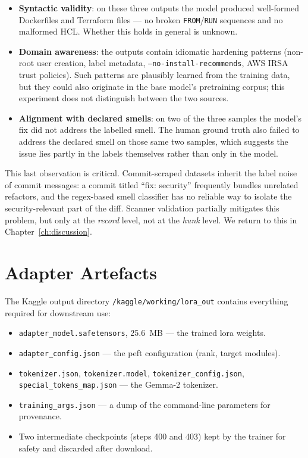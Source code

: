 \documentclass[12pt, a4paper]{report}
\begin{document}
\begin{itemize}
  \item \textbf{Syntactic validity}: on these three outputs the model
        produced well-formed Dockerfiles and Terraform files ---
        no broken \texttt{FROM}/\texttt{RUN} sequences and no malformed
        HCL. Whether this holds in general is unknown.
  \item \textbf{Domain awareness}: the outputs contain idiomatic
        hardening patterns (non-root user creation, label metadata,
        \texttt{--no-install-recommends}, AWS IRSA trust policies).
        Such patterns are plausibly learned from the training data,
        but they could also originate in the base model's pretraining
        corpus; this experiment does not distinguish between the two
        sources.
  \item \textbf{Alignment with declared smells}: on two of the three
        samples the model's fix did not address the labelled smell. The
        human ground truth also failed to address the declared smell on
        those same two samples, which suggests the issue lies partly in
        the labels themselves rather than only in the model.
\end{itemize}

This last observation is critical. Commit-scraped datasets inherit the
label noise of commit messages: a commit titled ``fix: security''
frequently bundles unrelated refactors, and the regex-based smell
classifier has no reliable way to isolate the security-relevant part of
the diff. Scanner validation partially mitigates this problem, but only
at the \emph{record} level, not at the \emph{hunk} level. We return to
this in Chapter~\ref{ch:discussion}.

\section{Adapter Artefacts}

The Kaggle output directory \texttt{/kaggle/working/lora\_out} contains
everything required for downstream use:

\begin{itemize}
  \item \texttt{adapter\_model.safetensors}, 25.6~MB --- the trained
        \gls{lora} weights.
  \item \texttt{adapter\_config.json} --- the \gls{peft} configuration
        (rank, target modules).
  \item \texttt{tokenizer.json}, \texttt{tokenizer.model},
        \texttt{tokenizer\_config.json},
        \texttt{special\_tokens\_map.json} --- the Gemma-2 tokenizer.
  \item \texttt{training\_args.json} --- a dump of the command-line
        parameters for provenance.
  \item Two intermediate checkpoints (steps 400 and 403) kept by the
        trainer for safety and discarded after download.
\end{itemize}
\end{document}
